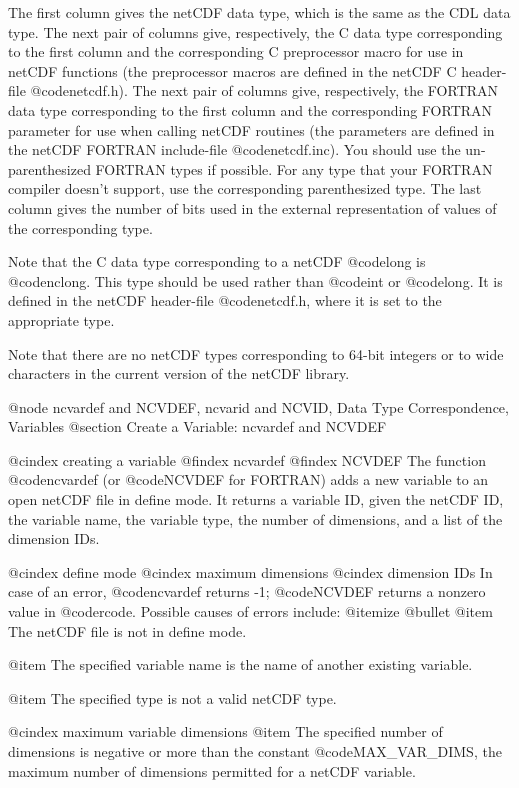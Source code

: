 The first column gives the netCDF data type, which is the same as the
CDL data type.  The next pair of columns give, respectively, the C data
type corresponding to the first column and the corresponding C preprocessor
macro for use in netCDF functions (the preprocessor macros are defined
in the netCDF C header-file @code{netcdf.h}).  The next pair of columns
give, respectively, the FORTRAN data type corresponding to the first
column and the corresponding FORTRAN parameter for use when calling netCDF
routines (the parameters are defined in the netCDF FORTRAN include-file
@code{netcdf.inc}).  You should use the un-parenthesized FORTRAN types
if possible.  For any type that your FORTRAN compiler doesn't support,
use the corresponding parenthesized type.  The last column gives the
number of bits used in the external representation of values of the
corresponding type.

Note that the C data type corresponding to a netCDF @code{long} is
@code{nclong}.  This type should be used rather than @code{int} or
@code{long}.  It is defined in the netCDF header-file @code{netcdf.h},
where it is set to the appropriate type.

Note that there are no netCDF types corresponding to 64-bit integers or
to wide characters in the current version of the netCDF library.

@node ncvardef and NCVDEF, ncvarid and NCVID, Data Type Correspondence, Variables
@section Create a Variable:  ncvardef and NCVDEF

@cindex creating a variable
@findex ncvardef
@findex NCVDEF
The function @code{ncvardef} (or @code{NCVDEF} for FORTRAN) adds a new
variable to an open netCDF file in define mode.  It returns a variable
ID, given the netCDF ID, the variable name, the variable type, the
number of dimensions, and a list of the dimension IDs.

@cindex define mode
@cindex maximum dimensions
@cindex dimension IDs
In case of an error, @code{ncvardef} returns -1; @code{NCVDEF} returns a
nonzero value in @code{rcode}.  Possible causes of errors include:
@itemize @bullet
@item
The netCDF file is not in define mode.

@item
The specified variable name is the name of another existing variable.

@item
The specified type is not a valid netCDF type.

@cindex maximum variable dimensions
@item
The specified number of dimensions is negative or more than the
constant @code{MAX_VAR_DIMS}, the maximum number of dimensions
permitted for a netCDF variable.

